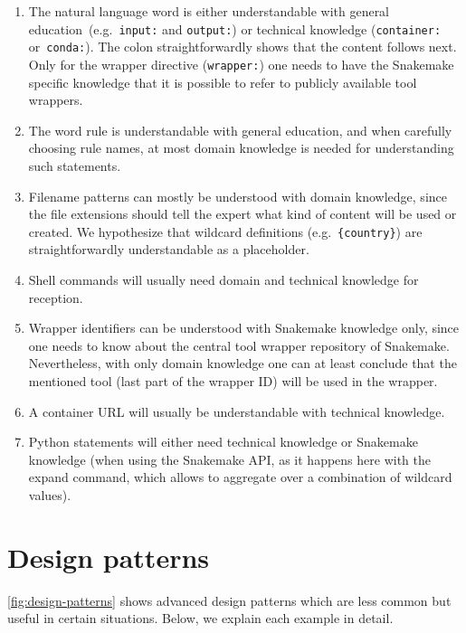 \documentclass{scrartcl}
\begin{document}
\begin{enumerate}
	\item The natural language word is either understandable with general education~(e.g.\ \lstinline!input:! and \lstinline!output:!) or technical knowledge (\lstinline!container:! or~\lstinline!conda:!).
	      The colon straightforwardly shows that the content follows next.
	      Only for the wrapper directive (\lstinline!wrapper:!) one needs to have the Snakemake specific knowledge that it is possible to refer to publicly available tool wrappers.
	\item
	      The word rule is understandable with general education, and when
	      carefully choosing rule names, at most domain knowledge is needed for
	      understanding such statements.
	\item
	      Filename patterns can mostly be understood with domain knowledge,
	      since the file extensions should tell the expert what kind of content
	      will be used or created.
	      We hypothesize that wildcard definitions (e.g.~\lstinline!{country}!) are straightforwardly understandable as a placeholder.
	\item
	      Shell commands will usually need domain and technical knowledge for
	      reception.
	\item
	      Wrapper identifiers can be understood with Snakemake knowledge only,
	      since one needs to know about the central tool wrapper repository of
	      Snakemake.
	      Nevertheless, with only domain knowledge one can at least conclude that the mentioned tool (last part of the wrapper ID) will be used in the wrapper.
	\item
	      A container URL will usually be understandable with technical
	      knowledge.
	\item
	      Python statements will either need technical knowledge or Snakemake
	      knowledge (when using the Snakemake API, as it happens here with the
	      expand command, which allows to aggregate over a combination of
	      wildcard values).
\end{enumerate}

\section{Design patterns}\label{sec:design-patterns}

\autoref{fig:design-patterns} shows advanced design patterns which are less common but useful in certain situations.
Below, we explain each example in detail.
\end{document}
